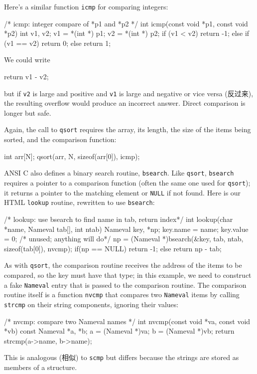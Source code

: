 Here's a similar function \verb'icmp' for comparing integers:
\begin{wellcode}
    /* icmp: integer compare of *p1 and *p2 */
    int icmp(const void *p1, const void *p2)
    {
        int v1, v2;
        v1 = *(int *) p1;
        v2 = *(int *) p2;
        if (v1 < v2)
            return -1;
        else if (v1 == v2)
            return 0;
        else
            return 1;
    }
\end{wellcode}
We could write
\begin{badcode}
    return v1 - v2;
\end{badcode}
but if \verb'v2' is large and positive and \verb'v1' is large and negative
or vice versa (反过来), the resulting overflow would produce an incorrect
answer. Direct comparison is longer but safe.

Again, the call to \verb'qsort' requires the array, its length, the size of
the items being sorted, and the comparison function:
\begin{wellcode}
    int arr[N];
    qsort(arr, N, sizeof(arr[0]), icmp);
\end{wellcode}

ANSI C also defines a binary search routine, \verb'bsearch'. Like
\verb'qsort', \verb'bsearch' requires a pointer to a comparison function
(often the same one used for \verb'qsort'); it returns a pointer to the
matching element or \verb'NULL' if not found. Here is our HTML
\verb'lookup' routine, rewritten to use \verb'bsearch':
\begin{wellcode}
    /* lookup: use bsearch to find name in tab, return index*/
    int lookup(char *name, Nameval tab[], int ntab)
    {
        Nameval key, *np;
        key.name = name;
        key.value = 0;  /* unused; anything will do*/
        np = (Nameval *)bsearch(&key, tab, ntab, sizeof(tab[0]), nvcmp);
        if(np == NULL)
            return -1;
        else
            return np - tab;
    }
\end{wellcode}

As with \verb'qsort', the comparison routine receives the address of the
items to be compared, so the key must have that type; in this example, we
need to construct a fake \verb'Nameval' entry that is passed to the
comparison routine. The comparison routine itself is a function
\verb'nvcmp' that compares two \verb'Nameval' items by calling
\verb'strcmp' on their string components, ignoring their values:
\begin{wellcode}
    /* nvcmp: compare two Nameval names */
    int nvcmp(const void *va, const void *vb)
    {
        const Nameval *a, *b;
        a = (Nameval *)va;
        b = (Nameval *)vb;
        return strcmp(a->name, b->name);
    }
\end{wellcode}
This is analogous (相似) to \verb'scmp' but differs because the strings are
stored as members of a structure.

